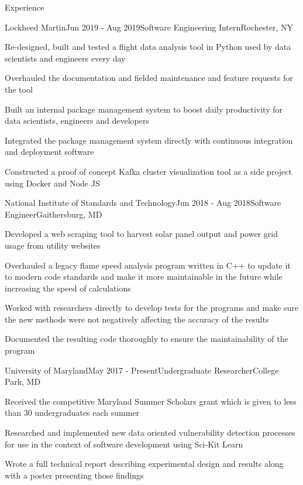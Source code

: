 \documentclass{resume} %
\begin{document}
\begin{rSection}{Experience}


\begin{rSubsection}{Lockheed Martin}{Jun 2019 - Aug 2019}{Software Engineering Intern}{Rochester, NY}
\item Re-designed, built and tested a flight data analysis tool in Python used by data scientists and engineers every day
\item Overhauled the documentation and fielded maintenance and feature requests for the tool
\item Built an internal package management system to boost daily productivity for data scientists, engineers and developers
\item Integrated the package management system directly with continuous integration and deployment software
\item Constructed a proof of concept Kafka cluster visualization tool as a side project using Docker and Node JS
\end{rSubsection}


\begin{rSubsection}{National Institute of Standards and Technology}{Jun 2018 - Aug 2018}{Software Engineer}{Gaithersburg, MD}
\item Developed a web scraping tool to harvest solar panel output and power grid usage from utility websites
\item Overhauled a legacy flame speed analysis program written in C++ to update it to modern code standards and make it more maintainable in the future while increasing the speed of calculations
\item Worked with researchers directly to develop tests for the programs and make sure the new methods were not negatively affecting the accuracy of the results
\item Documented the resulting code thoroughly to ensure the maintainability of the program
\end{rSubsection}


\begin{rSubsection}{University of Maryland}{May 2017 - Present}{Undergraduate Researcher}{College Park, MD}
\item Received the competitive Maryland Summer Scholars grant which is given to less than 30 undergraduates each summer
\item Researched and implemented new data oriented vulnerability detection processes for use in the context of software development using Sci-Kit Learn
\item Wrote a full technical report describing experimental design and results along with a poster presenting those findings
\end{rSubsection}


\end{rSection}
\end{document}
